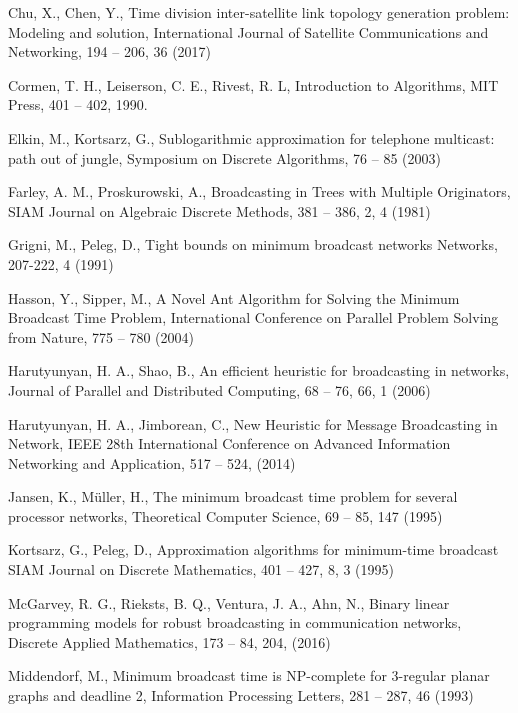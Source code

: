 \documentclass[preprint,12pt,review]{elsarticle}
\begin{document}
\begin{thebibliography}{}
%
%
Chu, X., Chen, Y.,
Time division inter-satellite link topology generation problem: Modeling and solution,
International Journal of Satellite Communications and Networking, 194 -- 206, 36 (2017)

Cormen, T. H., Leiserson, C. E., Rivest, R. L,
Introduction to Algorithms, 
MIT Press, 401 -- 402, 1990. 

Elkin, M., Kortsarz, G.,
Sublogarithmic approximation for telephone multicast: path out of jungle,
Symposium on Discrete Algorithms, 76 -- 85 (2003)

Farley, A. M., Proskurowski, A.,
Broadcasting in Trees with Multiple Originators,
SIAM Journal on Algebraic Discrete Methods, 381 -- 386, 2, 4 (1981)

Grigni, M., Peleg, D.,
Tight bounds on minimum broadcast networks
Networks, 207-222, 4 (1991)

Hasson, Y., Sipper, M.,
A Novel Ant Algorithm for Solving the Minimum Broadcast Time Problem,
International Conference on Parallel Problem Solving from Nature, 775 -- 780 (2004)

Harutyunyan, H. A., Shao, B.,
An efficient heuristic for broadcasting in networks,
Journal of Parallel and Distributed Computing, 68 -- 76, 66, 1 (2006)

Harutyunyan, H. A., Jimborean, C.,
New Heuristic for Message Broadcasting in Network,
IEEE 28th International Conference on Advanced Information Networking and Application, 517 -- 524, (2014)

Jansen, K., M\"uller, H.,
The minimum broadcast time problem for several processor networks, 
Theoretical Computer Science, 69 -- 85, 147 (1995)

Kortsarz, G., Peleg, D.,
Approximation algorithms for minimum-time broadcast
SIAM Journal on Discrete Mathematics, 401 -- 427, 8, 3 (1995)

McGarvey, R. G., Rieksts, B. Q., Ventura, J. A., Ahn, N.,
Binary linear programming models for robust broadcasting in communication networks,
Discrete Applied Mathematics, 173 -- 84, 204, (2016)

Middendorf, M.,
Minimum broadcast time is NP-complete for 3-regular planar graphs and deadline 2,
Information Processing Letters, 281 -- 287, 46 (1993)


\end{thebibliography}
\end{document}
